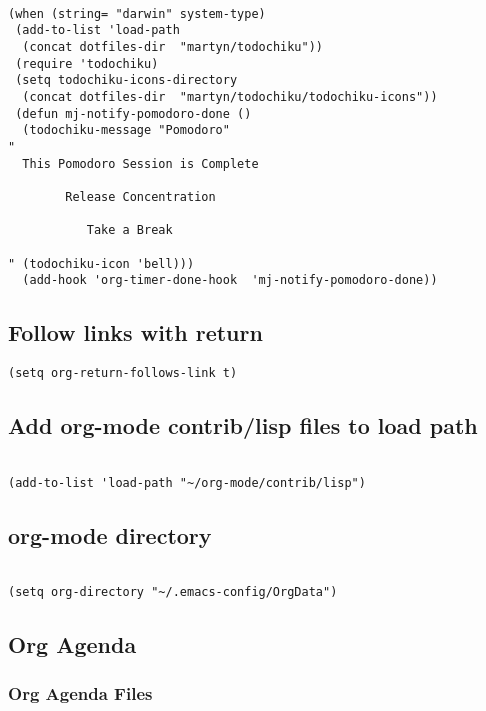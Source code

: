 \documentclass[colorlinks=true,urlcolor=blue,listings-sv]{article}
\begin{document}
\lstset{language=Lisp}
\begin{lstlisting}

(when (string= "darwin" system-type)
 (add-to-list 'load-path
  (concat dotfiles-dir  "martyn/todochiku"))
 (require 'todochiku)
 (setq todochiku-icons-directory 
  (concat dotfiles-dir  "martyn/todochiku/todochiku-icons"))
 (defun mj-notify-pomodoro-done ()
  (todochiku-message "Pomodoro"
"
  This Pomodoro Session is Complete

        Release Concentration

           Take a Break

" (todochiku-icon 'bell)))
  (add-hook 'org-timer-done-hook  'mj-notify-pomodoro-done))
\end{lstlisting}
\subsection{Follow links with return}
\label{sec-1-24}


\lstset{language=Lisp}
\begin{lstlisting}
(setq org-return-follows-link t)
\end{lstlisting}
\subsection{Add org-mode contrib/lisp files to load path}
\label{sec-1-25}
\label{45537f41-3389-45b8-9454-bc0e2e51ebe5}



\lstset{language=Lisp}
\begin{lstlisting}

(add-to-list 'load-path "~/org-mode/contrib/lisp")
\end{lstlisting}
\subsection{org-mode directory}
\label{sec-1-26}


\lstset{language=Lisp}
\begin{lstlisting}

(setq org-directory "~/.emacs-config/OrgData")
\end{lstlisting}
\subsection{Org Agenda}
\label{sec-1-27}
\subsubsection{Org Agenda Files}
\label{sec-1-27-1}
\end{document}
